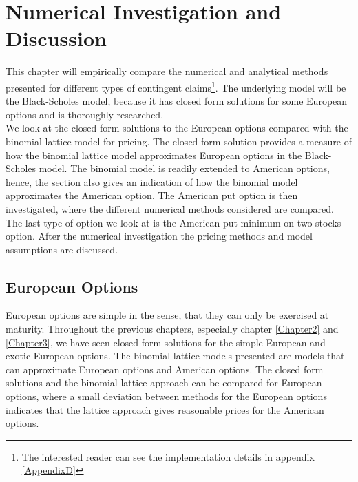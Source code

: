 
\chapter{Numerical Investigation and Discussion} %

\label{Chapter6} %

This chapter will empirically compare the numerical and analytical methods presented for different types of contingent claims\footnote{The interested reader can see the implementation details in appendix \ref{AppendixD}}. The underlying model will be the Black-Scholes model, because it has closed form solutions for some European options and is thoroughly researched.\\

We look at the closed form solutions to the European options compared with the binomial lattice model for pricing. The closed form solution provides a measure of how the binomial lattice model approximates European options in the Black-Scholes model. The binomial model is readily extended to American options, hence, the section also gives an indication of how the binomial model approximates the American option. The American put option is then investigated, where the different numerical methods considered are compared. The last type of option we look at is the American put minimum on two stocks option. After the numerical investigation the pricing methods and model assumptions are discussed.


\section{European Options}\label{EuroOption}
European options are simple in the sense, that they can only be exercised at maturity. Throughout the previous chapters, especially chapter \ref{Chapter2} and \ref{Chapter3}, we have seen closed form solutions for the simple European and exotic European options. The binomial lattice models presented are models that can approximate European options and American options. The closed form solutions and the binomial lattice approach can be compared for European options, where a small deviation between methods for the European options indicates that the lattice approach gives reasonable prices for the American options.\\

